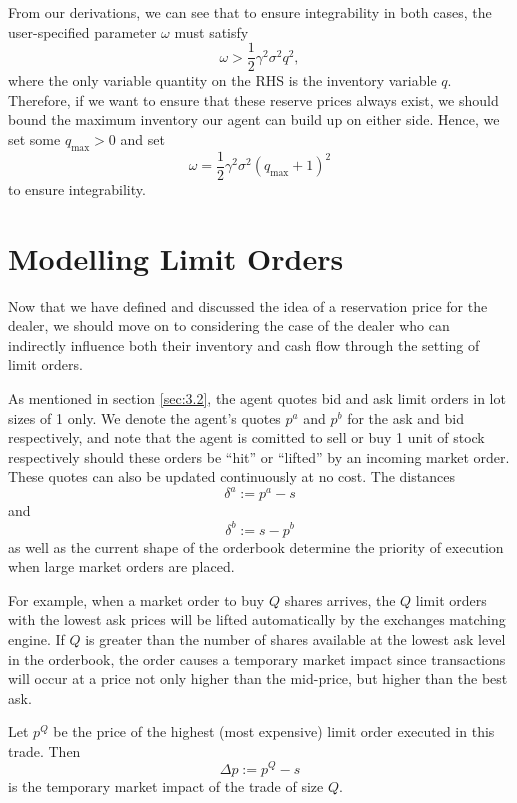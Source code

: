 From our derivations, we can see that to ensure integrability in both cases, the 
user-specified parameter $\omega$ must satisfy
\begin{equation*}
    \omega>\frac{1}{2}\gamma^2\sigma^2q^2,
\end{equation*}
where the only variable quantity on the RHS is the inventory variable $q$. Therefore,
if we want to ensure that these reserve prices always exist, we should bound the maximum
inventory our agent can build up on either side. Hence, we set some $q_{\textrm{max}}>0$
and set
\begin{equation*}
    \omega=\frac{1}{2}\gamma^2\sigma^2(q_{\textrm{max}}+1)^2
\end{equation*}
to ensure integrability.

\section{Modelling Limit Orders}\label{sec:3.5}
Now that we have defined and discussed the idea of a reservation price
for the dealer, we should move on to considering the case of the dealer
who can indirectly influence both their inventory and cash flow through
the setting of limit orders. 

As mentioned in section \ref{sec:3.2},
the agent quotes bid and ask limit orders in lot sizes of 1 only.
We denote the agent's quotes $p^a$ and $p^b$ for the ask and bid respectively,
and note that the agent is comitted to sell or buy 1 unit of stock respectively
should these orders be ``hit'' or ``lifted'' by an incoming market order.
These quotes can also be updated continuously at no cost. The distances
\begin{equation}
    \delta^a:=p^a-s
\end{equation}
and 
\begin{equation}
    \delta^b:=s-p^b
\end{equation}
as well as the current shape of the orderbook determine the priority 
of execution when large market orders are placed. 

For example, when a market order to buy $Q$ shares arrives, the $Q$ 
limit orders with the lowest ask prices will be lifted automatically
by the exchanges matching engine. If $Q$ is greater than the number
of shares available at the lowest ask level in the orderbook, the order
causes a temporary market impact since transactions will occur at a 
price not only higher than the mid-price, but higher than the best ask.

\begin{definition}
    Let $p^Q$ be the price of the highest (most expensive) limit order 
    executed in this trade. Then 
    \begin{equation}
        \Delta p:=p^Q-s
    \end{equation}
    is the temporary market impact of the trade of size $Q.$ 
\end{definition}

